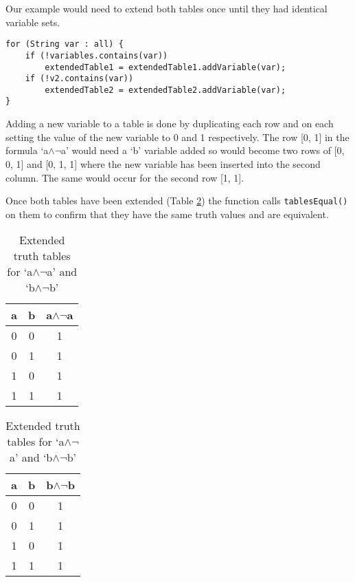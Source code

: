 \documentclass{report}
\begin{document}
Our example would need to extend both tables once until they had identical variable sets.

\begin{listing}[ht]
\begin{verbatim} 
for (String var : all) {
    if (!variables.contains(var))
        extendedTable1 = extendedTable1.addVariable(var);
    if (!v2.contains(var))
        extendedTable2 = extendedTable2.addVariable(var);
}
\end{verbatim}
\caption{Extending the tables by adding new variables}
\label{listing:extending_tables}
\end{listing}

Adding a new variable to a table is done by duplicating each row and on each setting the value of the new variable to 0 and 1 respectively. The row [0, 1] in the formula `a$\land\lnot$a' would need a `b' variable added so would become two rows of [0, 0, 1] and [0, 1, 1] where the new variable has been inserted into the second column. The same would occur for the second row [1, 1].

Once both tables have been extended (Table \ref{table:extended_a_and_not_a}) the function calls {\tt tablesEqual()} on them to confirm that they have the same truth values and are equivalent.

\begin{table}[h]
  \begin{center}
\begin{tabular}{ || c | c || c || }
      \hline
      a & b & a$\land\lnot$a \\ \hline
      0 & 0 & 1 \\
      0 & 1 & 1 \\
      1 & 0 & 1 \\
      1 & 1 & 1 \\
      \hline
\end{tabular}
\hspace{15mm}
\begin{tabular}{ || c | c || c || }
      \hline
      a & b & b$\land\lnot$b \\ \hline
      0 & 0 & 1 \\
      0 & 1 & 1 \\
      1 & 0 & 1 \\
      1 & 1 & 1 \\
      \hline
\end{tabular}
  \end{center}
  \caption{Extended truth tables for `a$\land\lnot$a' and `b$\land\lnot$b'}
  \label{table:extended_a_and_not_a}
\end{table}
\end{document}
